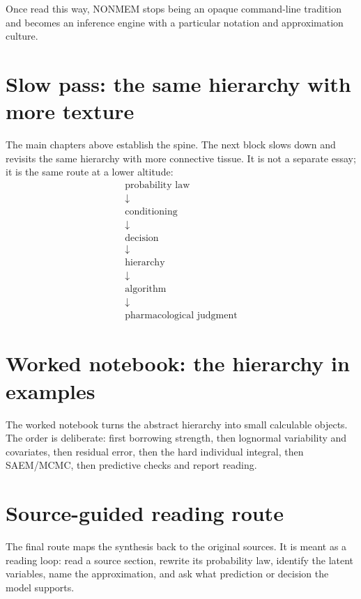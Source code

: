 \documentclass[a4paper]{article}
\begin{document}
Once read this way, NONMEM stops being an opaque command-line tradition and becomes an inference engine with a particular notation and approximation culture.

\section{Slow pass: the same hierarchy with more texture}

The main chapters above establish the spine.  The next block slows down and revisits the same hierarchy with more connective tissue.  It is not a separate essay; it is the same route at a lower altitude:
\[
  \begin{array}{c}
    \text{probability law}\\
    \downarrow\\
    \text{conditioning}\\
    \downarrow\\
    \text{decision}\\
    \downarrow\\
    \text{hierarchy}\\
    \downarrow\\
    \text{algorithm}\\
    \downarrow\\
    \text{pharmacological judgment}
  \end{array}
\]



\section{Worked notebook: the hierarchy in examples}

The worked notebook turns the abstract hierarchy into small calculable objects.  The order is deliberate: first borrowing strength, then lognormal variability and covariates, then residual error, then the hard individual integral, then SAEM/MCMC, then predictive checks and report reading.



\section{Source-guided reading route}

The final route maps the synthesis back to the original sources.  It is meant as a reading loop: read a source section, rewrite its probability law, identify the latent variables, name the approximation, and ask what prediction or decision the model supports.
\end{document}
